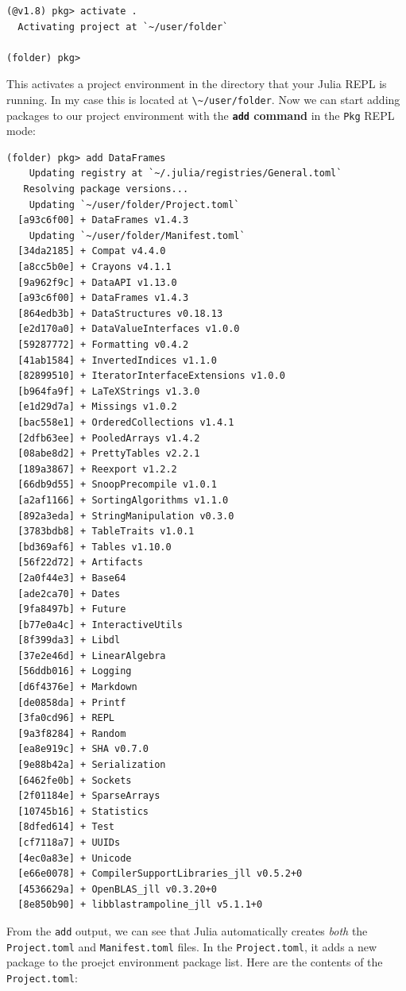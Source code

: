 \documentclass[
  notoc %
]{tufte-book}
\newcommand{\passthrough}[1]{#1}
\begin{document}
\begin{lstlisting}
(@v1.8) pkg> activate .
  Activating project at `~/user/folder`

(folder) pkg>
\end{lstlisting}

This activates a project environment in the directory that your Julia
REPL is running. In my case this is located at
\passthrough{\lstinline!\~/user/folder!}. Now we can start adding
packages to our project environment with the
\textbf{\passthrough{\lstinline!add!} command} in the
\passthrough{\lstinline!Pkg!} REPL mode:

\begin{lstlisting}
(folder) pkg> add DataFrames
    Updating registry at `~/.julia/registries/General.toml`
   Resolving package versions...
    Updating `~/user/folder/Project.toml`
  [a93c6f00] + DataFrames v1.4.3
    Updating `~/user/folder/Manifest.toml`
  [34da2185] + Compat v4.4.0
  [a8cc5b0e] + Crayons v4.1.1
  [9a962f9c] + DataAPI v1.13.0
  [a93c6f00] + DataFrames v1.4.3
  [864edb3b] + DataStructures v0.18.13
  [e2d170a0] + DataValueInterfaces v1.0.0
  [59287772] + Formatting v0.4.2
  [41ab1584] + InvertedIndices v1.1.0
  [82899510] + IteratorInterfaceExtensions v1.0.0
  [b964fa9f] + LaTeXStrings v1.3.0
  [e1d29d7a] + Missings v1.0.2
  [bac558e1] + OrderedCollections v1.4.1
  [2dfb63ee] + PooledArrays v1.4.2
  [08abe8d2] + PrettyTables v2.2.1
  [189a3867] + Reexport v1.2.2
  [66db9d55] + SnoopPrecompile v1.0.1
  [a2af1166] + SortingAlgorithms v1.1.0
  [892a3eda] + StringManipulation v0.3.0
  [3783bdb8] + TableTraits v1.0.1
  [bd369af6] + Tables v1.10.0
  [56f22d72] + Artifacts
  [2a0f44e3] + Base64
  [ade2ca70] + Dates
  [9fa8497b] + Future
  [b77e0a4c] + InteractiveUtils
  [8f399da3] + Libdl
  [37e2e46d] + LinearAlgebra
  [56ddb016] + Logging
  [d6f4376e] + Markdown
  [de0858da] + Printf
  [3fa0cd96] + REPL
  [9a3f8284] + Random
  [ea8e919c] + SHA v0.7.0
  [9e88b42a] + Serialization
  [6462fe0b] + Sockets
  [2f01184e] + SparseArrays
  [10745b16] + Statistics
  [8dfed614] + Test
  [cf7118a7] + UUIDs
  [4ec0a83e] + Unicode
  [e66e0078] + CompilerSupportLibraries_jll v0.5.2+0
  [4536629a] + OpenBLAS_jll v0.3.20+0
  [8e850b90] + libblastrampoline_jll v5.1.1+0
\end{lstlisting}

From the \passthrough{\lstinline!add!} output, we can see that Julia
automatically creates \emph{both} the
\passthrough{\lstinline!Project.toml!} and
\passthrough{\lstinline!Manifest.toml!} files. In the
\passthrough{\lstinline!Project.toml!}, it adds a new package to the
proejct environment package list. Here are the contents of the
\passthrough{\lstinline!Project.toml!}:
\end{document}
